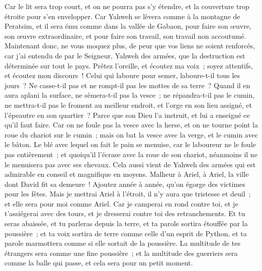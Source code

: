 \begin{multicols}{2}
Car le lit sera trop court, et on ne pourra pas s'y étendre, et la couverture trop étroite pour s'en envelopper.
Car Yahweh se lèvera comme à la montagne de Peratsim, et il sera ému comme dans la vallée de Gabaon, pour faire son œuvre, son œuvre extraordinaire, et pour faire son travail, son travail non accoutumé.
Maintenant donc, ne vous moquez plus, de peur que vos liens ne soient renforcés, car j'ai entendu de par le Seigneur, Yahweh des armées, que la destruction est déterminée sur tout le pays. 
Prêtez l'oreille, et écoutez ma voix~; soyez attentifs, et écoutez mon discours~!
Celui qui laboure pour semer, laboure-t-il tous les jours~? Ne casse-t-il pas et ne rompt-il pas les mottes de sa terre~? 
Quand il en aura aplani la surface, ne sèmera-t-il pas la vesce~; ne répandra-t-il pas le cumin, ne mettra-t-il pas le froment au meilleur endroit, et l'orge en son lieu assigné, et l'épeautre en son quartier~?
Parce que son Dieu l'a instruit, et lui a enseigné ce qu'il faut faire.
Car on ne foule pas la vesce avec la herse, et on ne tourne point la roue du chariot sur le cumin~; mais on bat la vesce avec la verge, et le cumin avec le bâton.
Le blé avec lequel on fait le pain se menuise, car le laboureur ne le foule pas entièrement~; et quoiqu'il l'écrase avec la roue de son chariot, néanmoins il ne le menuisera pas avec ses chevaux.
Cela aussi vient de Yahweh des armées qui est admirable en conseil et magnifique en moyens.
\VerseOne{}Malheur à Ariel, à Ariel, la ville dont David fit sa demeure~! Ajoutez année à année, qu'on égorge des victimes pour les fêtes.
Mais je mettrai Ariel à l'étroit, il n'y aura que tristesse et deuil~; et elle sera pour moi comme Ariel.
Car je camperai en rond contre toi, et je t'assiégerai avec des tours, et je dresserai contre toi des retranchements.
Et tu seras abaissée, et tu parleras depuis la terre, et ta parole sortira étouffée par la poussière~; et ta voix sortira de terre comme celle d'un esprit de Python, et ta parole marmottera comme si elle sortait de la poussière.
La multitude de tes étrangers sera comme une fine poussière~; et la multitude des guerriers sera comme la balle qui passe, et cela sera pour un petit moment.

\end{multicols}
